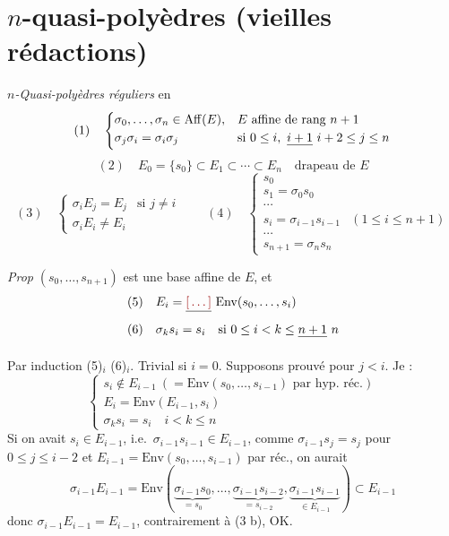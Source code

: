 \documentclass[11pt,a4paper]{article}
\begin{document}
\section{$n$-quasi-polyèdres (vieilles rédactions)}

\emph{$n$-Quasi-polyèdres réguliers} en  \ill{}
\[
(1)\quad \begin{cases}
\sigma_0,\dots,\sigma_n \in \mathrm{Aff}(E), & E \text{ affine de rang } n+1\\
\sigma_j\sigma_i = \sigma_i\sigma_j & \text{si } 0\le i,\ \struck{i+1}\ i+2\le j\le n
\end{cases}
\]
\[
(2)\quad E_0 = \{s_0\} \subset E_1 \subset \cdots \subset E_n \quad \text{drapeau de } E
\]
\[
(3)\quad \begin{cases}
\sigma_i E_j = E_j & \text{si } j\ne i\\
\sigma_i E_i \ne E_i
\end{cases}
\qquad
(4)\quad \begin{cases}
s_0\\
s_1 = \sigma_0 s_0\\
\cdots\\
s_i = \sigma_{i-1} s_{i-1} & (1\le i\le n+1)\\
\cdots\\
s_{n+1} = \sigma_n s_n
\end{cases}
\]

\emph{Prop} $(s_0,\dots,s_{n+1})$ est une base affine de $E$, et
\[
\begin{aligned}
(5)&\quad E_i = \struck{\ill{}}\ \mathrm{Env}(s_0,\dots,s_i)\\
(6)&\quad \sigma_k s_i = s_i \quad \text{si } 0\le i< k\le \struck{n+1}\ n
\end{aligned}
\]

Par induction  (5)$_i$ (6)$_i$. Trivial si $i=0$. Supposons  prouvé pour $j<i$. Je  \ill{} :
\[
\begin{cases}
s_i \notin E_{i-1} \ (= \mathrm{Env}(s_0,\dots,s_{i-1}) \text{ par hyp.\ réc.})\\
E_i = \mathrm{Env}(E_{i-1}, s_i)\\
\sigma_k s_i = s_i \quad i<k\le n
\end{cases}
\]
Si on avait $s_i \in E_{i-1}$, i.e.\ $\sigma_{i-1}s_{i-1} \in E_{i-1}$, comme $\sigma_{i-1}s_j = s_j$ pour $0\le j\le i-2$ et $E_{i-1} = \mathrm{Env}(s_0,\dots,s_{i-1})$ par réc., on aurait
\[
\sigma_{i-1}E_{i-1} = \mathrm{Env}(\underbrace{\sigma_{i-1}s_0}_{=s_0},\dots,\underbrace{\sigma_{i-1}s_{i-2}}_{=s_{i-2}},\underbrace{\sigma_{i-1}s_{i-1}}_{\in E_{i-1}}) \subset E_{i-1}
\]
donc $\sigma_{i-1}E_{i-1} = E_{i-1}$, contrairement à (3 b), OK.
\end{document}
